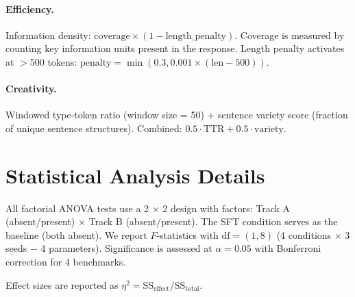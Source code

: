 \documentclass{article}
\begin{document}
\paragraph{Efficiency.}
Information density: $\text{coverage} \times (1 - \text{length\_penalty})$.
Coverage is measured by counting key information units present in the response.
Length penalty activates at $>$500 tokens: $\text{penalty} = \min(0.3, 0.001 \times (\text{len} - 500))$.

\paragraph{Creativity.}
Windowed type-token ratio (window size = 50) + sentence variety score (fraction of unique sentence structures).
Combined: $0.5 \cdot \text{TTR} + 0.5 \cdot \text{variety}$.


\section{Statistical Analysis Details}
\label{app:stats}

All factorial ANOVA tests use a 2 $\times$ 2 design with factors: Track A (absent/present) $\times$ Track B (absent/present).
The SFT condition serves as the baseline (both absent).
We report $F$-statistics with $\text{df} = (1, 8)$ (4 conditions $\times$ 3 seeds $-$ 4 parameters).
Significance is assessed at $\alpha = 0.05$ with Bonferroni correction for 4 benchmarks.

Effect sizes are reported as $\eta^2 = \text{SS}_{\text{effect}} / \text{SS}_{\text{total}}$.
\end{document}
